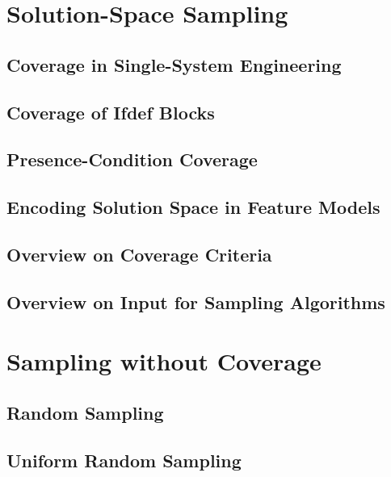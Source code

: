 \section{Solution-Space Sampling}

\subsection{Coverage in Single-System Engineering}

\subsection{Coverage of Ifdef Blocks}

\subsection{Presence-Condition Coverage}

\subsection{Encoding Solution Space in Feature Models}

\subsection{Overview on Coverage Criteria}

\subsection{Overview on Input for Sampling Algorithms}

%

\lessonslearned{
	\item \ldots
}{
	\item \ldots
}{
	\ldots
}

\sectionend

\section{Sampling without Coverage}

\subsection{Random Sampling}

\subsection{Uniform Random Sampling}

